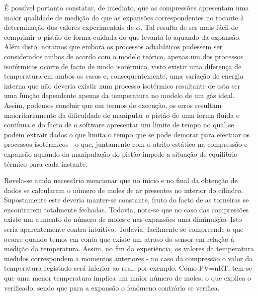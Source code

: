 \documentclass[9pt]{extarticle}
\begin{document}
\begin{multicols}{2}
\par É possível portanto constatar, de imediato, que as compressões apresentam uma maior qualidade de medição do que as expansões correspondentes no tocante à determinação dos valores experimentais de $\alpha$. Tal resulta de ser mais fácil de comprimir o pistão de forma cuidada do que levantá-lo aquando da expansão. Além disto, notamos que embora os processos adiabáticos pudessem ser considerados ambos de acordo com o modelo teórico, apenas um dos processos isotérmicos ocorre de facto de modo isotérmico, visto existir uma diferença de temperatura em ambos os casos e, consequentemente, uma variação de energia interna que não deveria existir num processo isotérmico resultante de esta ser uma função dependente apenas da temperatura no modelo de um gás ideal. Assim, podemos concluir que em termos de execução, os erros resultam maioritariamente da dificuldade de manipular o pistão de uma forma fluida e contínua e do facto de o software apresentar um limite de tempo no qual se podem extrair dados o que limita o tempo que se pode demorar para efectuar os processos isotérmicos - o que, juntamente com o atrito estático na compressão e expansão aquando da manipulação do pistão impede a situação de equilíbrio térmico para cada instante.

\par Revela-se ainda necessário mencionar que no início e no final da obtenção de dados se calcularam o número de moles de ar presentes no interior do cilindro. Supostamente este deveria manter-se constante, fruto do facto de as torneiras se encontrarem totalmente fechadas. Todavia, nota-se que no caso das compressões existe um aumento do número de moles e nas expansões uma diminuição. Isto seria aparentemente contra-intuitivo. Todavia, facilmente se compreende o que ocorre quando temos em conta que existe um atraso do sensor em relação à medição da temperatura. Assim, no fim da experiência, os valores da temperatura medidos correspondem a momentos anteriores - no caso da compressão o valor da temperatura registado será inferior ao real, por exemplo. Como PV=nRT, tem-se que uma menor temperatura implica um maior número de moles, o que explica o verificado, sendo que para a expansão o fenómeno contrário se verifica.


\end{multicols}
\end{document}
